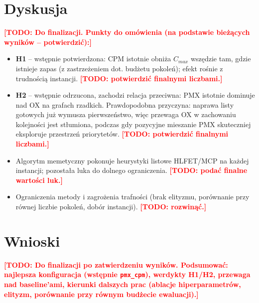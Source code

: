 \documentclass[12pt,a4paper]{article}
\newcommand{\todo}[1]{\textcolor{red}{\textbf{[TODO: #1]}}}
\begin{document}
\section{Dyskusja}
\label{sec:dyskusja}
\todo{Do finalizacji. Punkty do omówienia (na podstawie bieżących wyników -- potwierdzić):}
\begin{itemize}[itemsep=2pt, topsep=3pt]
    \item \textbf{H1} -- wstępnie potwierdzona: CPM istotnie obniża $C_{max}$ wszędzie tam, gdzie istnieje zapas (z zastrzeżeniem dot. budżetu pokoleń); efekt rośnie z trudnością instancji. \todo{potwierdzić finalnymi liczbami.}
    \item \textbf{H2} -- wstępnie odrzucona, zachodzi relacja przeciwna: PMX istotnie dominuje nad OX na grafach rzadkich. Prawdopodobna przyczyna: naprawa listy gotowych już wymusza pierwszeństwo, więc przewaga OX w zachowaniu kolejności jest stłumiona, podczas gdy pozycyjne mieszanie PMX skuteczniej eksploruje przestrzeń priorytetów. \todo{potwierdzić finalnymi liczbami.}
    \item Algorytm memetyczny pokonuje heurystyki listowe HLFET/MCP na każdej instancji; pozostała luka do dolnego ograniczenia. \todo{podać finalne wartości luk.}
    \item Ograniczenia metody i zagrożenia trafności (brak elityzmu, porównanie przy równej liczbie pokoleń, dobór instancji). \todo{rozwinąć.}
\end{itemize}

\section{Wnioski}
\label{sec:wnioski}
\todo{Do finalizacji po zatwierdzeniu wyników. Podsumować: najlepsza konfiguracja (wstępnie \texttt{pmx\_cpm}), werdykty H1/H2, przewaga nad baseline'ami, kierunki dalszych prac (ablacje hiperparametrów, elityzm, porównanie przy równym budżecie ewaluacji).}
\end{document}
